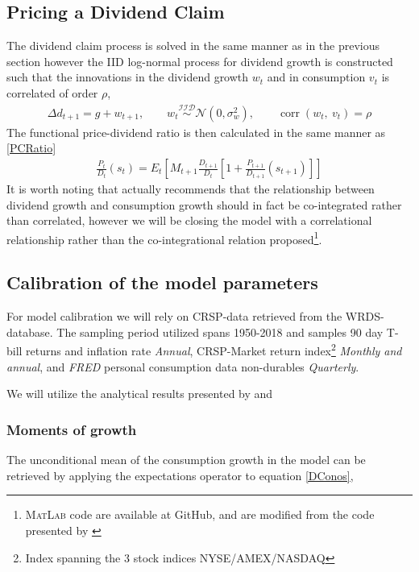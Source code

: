 \subsection{Pricing a Dividend Claim}
The dividend claim process is solved in the same manner as in the previous section however the IID log-normal process for dividend growth is constructed such that the innovations in the dividend growth $w_t$ and in consumption $v_t$ is correlated of order $\rho$,
\begin{align}
    \Delta d_{t+1} = g + w_{t+1},\qquad w_t \overset{\mathcal{IID}}{\sim}\mathcal{N}\left(0,\sigma^2_w \right),\qquad \operatorname{corr}\left( w_t,\ v_t \right) = \rho
\end{align}
The functional price-dividend ratio is then calculated in the same manner as \eqref{PCRatio}
\begin{align}
    \frac{P_{t}}{D_{t}}\left(s_{t}\right)=E_{t}\left[M_{t+1} \frac{D_{t+1}}{D_{t}}\left[1+\frac{P_{t+1}}{D_{t+1}}\left(s_{t+1}\right)\right]\right] \label{pd_ratio}
\end{align}
It is worth noting that \citet{Campbell1999} actually recommends that the relationship between dividend growth and consumption growth should in fact be co-integrated rather than correlated, however we will be closing the model with a correlational relationship rather than the co-integrational relation proposed\footnote{\textsc{MatLab} code are available at GitHub, and are modified from the code presented by \citet{Costa2009}}.

\subsection{Calibration of the model parameters}
For model calibration we will rely on CRSP-data retrieved from the WRDS-database. The sampling period utilized spans 1950-2018 and samples 90 day T-bill returns and inflation rate \textit{Annual}, CRSP-Market return index\footnote{Index spanning the 3 stock indices NYSE/AMEX/NASDAQ} \textit{Monthly and annual}, and \textit{FRED} personal consumption data non-durables \textit{Quarterly}.  


We will utilize the analytical results presented by \citet{Campbell1999} and \citet{StigVinter2010}

\subsubsection{Moments of growth}
The unconditional mean of the consumption growth in the model can be retrieved by applying the expectations operator to equation \eqref{DConos},

